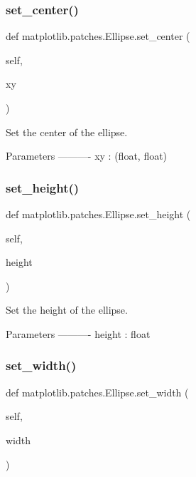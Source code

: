 \subsubsection{\texorpdfstring{set\+\_\+center()}{set\_center()}}
{\footnotesize\ttfamily def matplotlib.\+patches.\+Ellipse.\+set\+\_\+center (\begin{DoxyParamCaption}\item[{}]{self,  }\item[{}]{xy }\end{DoxyParamCaption})}

\begin{DoxyVerb}Set the center of the ellipse.

Parameters
----------
xy : (float, float)
\end{DoxyVerb}
 \mbox{\label{classmatplotlib_1_1patches_1_1Ellipse_a1e9e57643cbc37eb5482b0872b743604}} 
\subsubsection{\texorpdfstring{set\+\_\+height()}{set\_height()}}
{\footnotesize\ttfamily def matplotlib.\+patches.\+Ellipse.\+set\+\_\+height (\begin{DoxyParamCaption}\item[{}]{self,  }\item[{}]{height }\end{DoxyParamCaption})}

\begin{DoxyVerb}Set the height of the ellipse.

Parameters
----------
height : float
\end{DoxyVerb}
 \mbox{\label{classmatplotlib_1_1patches_1_1Ellipse_a550e52dde5db8ebd22b17735c96ae4cf}} 
\subsubsection{\texorpdfstring{set\+\_\+width()}{set\_width()}}
{\footnotesize\ttfamily def matplotlib.\+patches.\+Ellipse.\+set\+\_\+width (\begin{DoxyParamCaption}\item[{}]{self,  }\item[{}]{width }\end{DoxyParamCaption})}

